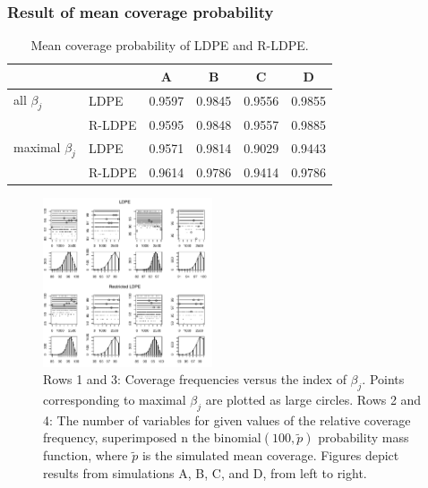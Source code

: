 \begin{frame}
  \frametitle{Result of mean coverage probability}
  
  \begin{table}[ht]
  \caption{Mean coverage probability of LDPE and R-LDPE.}
  \begin{tabular}{llcccc}
  \toprule
  &&A&B&C&D\\
  \midrule
  all $\beta_j$& LDPE & 0.9597 & 0.9845 & 0.9556 & 0.9855 \\
   &R-LDPE & 0.9595 & 0.9848 & 0.9557 & 0.9885  \\
   maximal $\beta_j$ & LDPE&  0.9571 & 0.9814& 0.9029 &0.9443\\
  & R-LDPE & 0.9614 & 0.9786 & 0.9414 & 0.9786\\
  \bottomrule
  \end{tabular}
  \label{table:meancover}
\end{table}
\end{frame}


\begin{frame}
\begin{centering}
\begin{figure}%
\includegraphics[width = 5cm]{1110/coverage.pdf}
\caption{Rows 1 and 3: Coverage frequencies versus the index of $\beta_j$.
Points corresponding to maximal $\beta_j$ are plotted as large circles.
Rows 2 and 4: The number %
of variables for given values of the relative coverage frequency,
superimposed n the binomial$(100,\tilde p)$ probability mass function,
where $\tilde p$ is the simulated mean coverage.
Figures depict results from simulations A, B, C, and D, from left to right.}
\label{fig:cover}
\end{figure}
\end{centering}

\end{frame}

